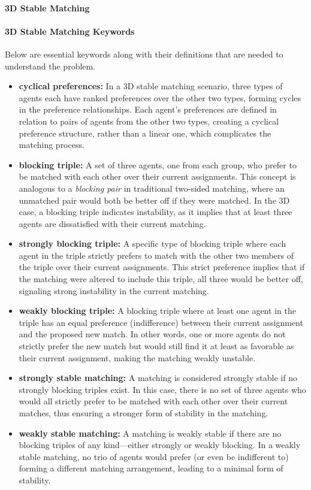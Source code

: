 \paragraph{3D Stable Matching}

\paragraph{3D Stable Matching Keywords}
Below are essential keywords along with their definitions that are needed to understand the problem. \cite{3dstable}
\begin{itemize} 
\item \textbf{cyclical preferences:} In a 3D stable matching scenario, three types of agents each have ranked preferences over the other two types, forming cycles in the preference relationships. Each agent’s preferences are defined in relation to pairs of agents from the other two types, creating a cyclical preference structure, rather than a linear one, which complicates the matching process.
\item \textbf{blocking triple:} A set of three agents, one from each group, who prefer to be matched with each other over their current assignments. This concept is analogous to a \emph{blocking pair} in traditional two-sided matching, where an unmatched pair would both be better off if they were matched. In the 3D case, a blocking triple indicates instability, as it implies that at least three agents are dissatisfied with their current matching.

\item \textbf{strongly blocking triple:} A specific type of blocking triple where each agent in the triple strictly prefers to match with the other two members of the triple over their current assignments. This strict preference implies that if the matching were altered to include this triple, all three would be better off, signaling strong instability in the current matching.

\item \textbf{weakly blocking triple:} A blocking triple where at least one agent in the triple has an equal preference (indifference) between their current assignment and the proposed new match. In other words, one or more agents do not strictly prefer the new match but would still find it at least as favorable as their current assignment, making the matching weakly unstable.

\item \textbf{strongly stable matching:} A matching is considered strongly stable if no strongly blocking triples exist. In this case, there is no set of three agents who would all strictly prefer to be matched with each other over their current matches, thus ensuring a stronger form of stability in the matching.

\item \textbf{weakly stable matching:} A matching is weakly stable if there are no blocking triples of any kind—either strongly or weakly blocking. In a weakly stable matching, no trio of agents would prefer (or even be indifferent to) forming a different matching arrangement, leading to a minimal form of stability.

\end{itemize}

